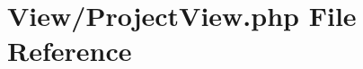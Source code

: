 \hypertarget{_project_view_8php}{}\section{View/\+Project\+View.php File Reference}
\label{_project_view_8php}
